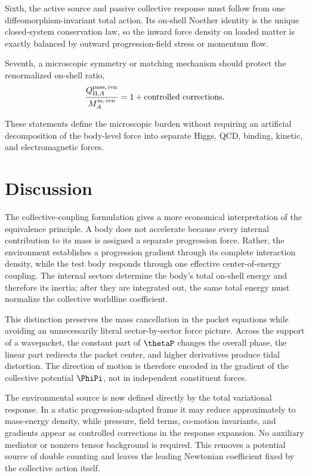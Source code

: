 \documentclass[12pt]{article}
\begin{document}
Sixth, the active source and passive collective response must follow from one diffeomorphism-invariant total action.  Its on-shell Noether identity is the unique closed-system conservation law, so the inward force density on loaded matter is exactly balanced by outward progression-field stress or momentum flow.

Seventh, a microscopic symmetry or matching mechanism should protect the renormalized on-shell ratio,
\begin{equation}
    \frac{Q_{\Pi,A}^{{\rm pass},\,\rm ren}}
    {M_A^{{\rm in},\,\rm ren}}=1+\text{controlled corrections}.
    \label{eq:minimal-matching}
\end{equation}

These statements define the microscopic burden without requiring an artificial decomposition of the body-level force into separate Higgs, QCD, binding, kinetic, and electromagnetic forces.
\section{Discussion}

The collective-coupling formulation gives a more economical interpretation of the equivalence principle.  A body does not accelerate because every internal contribution to its mass is assigned a separate progression force.  Rather, the environment establishes a progression gradient through its complete interaction density, while the test body responds through one effective center-of-energy coupling.  The internal sectors determine the body's total on-shell energy and therefore its inertia; after they are integrated out, the same total energy must normalize the collective worldline coefficient.

This distinction preserves the mass cancellation in the packet equations while avoiding an unnecessarily literal sector-by-sector force picture.  Across the support of a wavepacket, the constant part of \(\thetaP\) changes the overall phase, the linear part redirects the packet center, and higher derivatives produce tidal distortion.  The direction of motion is therefore encoded in the gradient of the collective potential \(\PhiPi\), not in independent constituent forces.

The environmental source is now defined directly by the total variational response.  In a static progression-adapted frame it may reduce approximately to mass-energy density, while pressure, field terms, co-motion invariants, and gradients appear as controlled corrections in the response expansion.  No auxiliary mediator or nonzero tensor background is required.  This removes a potential source of double counting and leaves the leading Newtonian coefficient fixed by the collective action itself.
\end{document}
